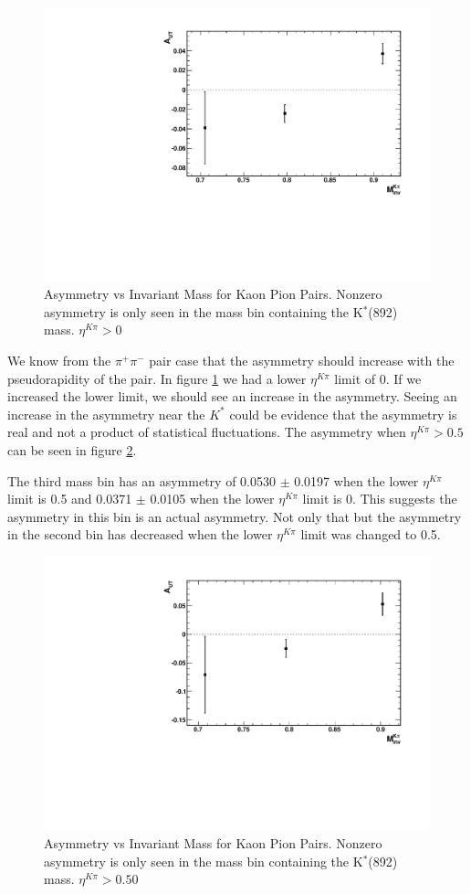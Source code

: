 \documentclass[abstract = on,listof=totoc, bibliography=totoc]{scrreprt}
\newcommand{\pip}{\pi^+}
\newcommand{\pim}{\pi^-}
\newcommand{\pair}{$\pip\pim$ }
\newcommand{\etakp}{\eta^{K\pi}}
\begin{document}
\begin{figure}
\begin{center}
\includegraphics[width = .6\textwidth]{AutVMass_KPi}
\caption[Asymmetry vs Invariant Mass for Kaon Pion Pairs]{Asymmetry vs Invariant Mass for Kaon Pion Pairs. Nonzero asymmetry is only seen in the mass bin containing the K$^*$(892) mass. $\etakp > 0$}
\label{fig:AutVMass_KPi}
\end{center}
\end{figure}


We know from the \pair pair case that the asymmetry should increase with the pseudorapidity of the pair. In figure \ref{fig:AutVMass_KPi} we had a lower $\etakp$ limit of 0. If we increased the lower limit, we should see an increase in the asymmetry. Seeing an increase in the asymmetry near the $K^*$ could be evidence that the asymmetry is real and not a product of statistical fluctuations. The asymmetry when $\etakp > 0.5$ can be seen in figure \ref{fig:AutVMass_KPi_eta050}. 

The third mass bin has an asymmetry of 0.0530 $\pm$ 0.0197 when the lower $\etakp$ limit is 0.5 and 0.0371 $\pm$ 0.0105 when the lower $\etakp$ limit is 0. This suggests the asymmetry in this bin is an actual asymmetry. Not only that but the asymmetry in the second bin has decreased when the lower $\etakp$ limit was changed to 0.5. 

\begin{figure}
\begin{center}
\includegraphics[width = .6\textwidth]{AsymVsM_eta050}
\caption[Asymmetry vs Invariant Mass for Kaon Pion Pairs]{Asymmetry vs Invariant Mass for Kaon Pion Pairs. Nonzero asymmetry is only seen in the mass bin containing the K$^*$(892) mass. $\etakp > 0.50$}
\label{fig:AutVMass_KPi_eta050}
\end{center}
\end{figure}
\end{document}
